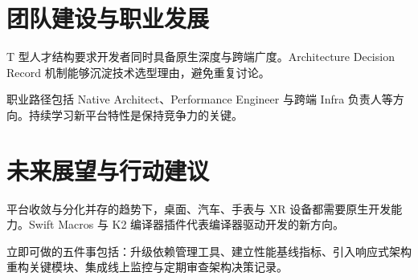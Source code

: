 \chapter{团队建设与职业发展}
T 型人才结构要求开发者同时具备原生深度与跨端广度。Architecture Decision Record 机制能够沉淀技术选型理由，避免重复讨论。\par
职业路径包括 Native Architect、Performance Engineer 与跨端 Infra 负责人等方向。持续学习新平台特性是保持竞争力的关键。\par
\chapter{未来展望与行动建议}
平台收敛与分化并存的趋势下，桌面、汽车、手表与 XR 设备都需要原生开发能力。Swift Macros 与 K2 编译器插件代表编译器驱动开发的新方向。\par
立即可做的五件事包括：升级依赖管理工具、建立性能基线指标、引入响应式架构重构关键模块、集成线上监控与定期审查架构决策记录。\par
